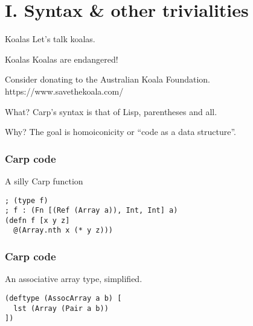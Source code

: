 \documentclass[14pt,aspectratio=169]{beamer}
\begin{document}
  \section{I. Syntax \& other trivialities}
  \begin{frame}{Koalas}
    Let’s talk koalas.
  \end{frame}
  \begin{frame}{Koalas}
    Koalas are endangered!
    \linebreak

    Consider donating to the Australian Koala Foundation.
    https://www.savethekoala.com/
  \end{frame}
  \begin{frame}{What?}
    Carp’s syntax is that of Lisp, parentheses and all.
  \end{frame}
  \begin{frame}{Why?}
    The goal is homoiconicity or “code as a data structure”.
  \end{frame}
  \begin{frame}[fragile]
  \frametitle{Carp code}
    \begin{listing}[H]
      \caption{A silly Carp function}
      \begin{verbatim}
; (type f)
; f : (Fn [(Ref (Array a)), Int, Int] a)
(defn f [x y z]
  @(Array.nth x (* y z)))
      \end{verbatim}
    \end{listing}
  \end{frame}
  \begin{frame}[fragile]
    \frametitle{Carp code}
    \begin{listing}[H]
      \caption{An associative array type, simplified.}
      \begin{verbatim}
(deftype (AssocArray a b) [
  lst (Array (Pair a b))
])
      \end{verbatim}
    \end{listing}
  \end{frame}
\end{document}
